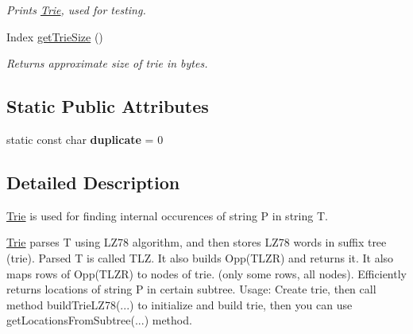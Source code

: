 \begin{DoxyCompactItemize}
\begin{DoxyCompactList}\small\item\em \-Prints \hyperlink{class_trie}{\-Trie}, used for testing. \end{DoxyCompactList}\item 
\hypertarget{class_trie_af486a8cc3ac5664f936a11ab71f7794e}{\-Index \hyperlink{class_trie_af486a8cc3ac5664f936a11ab71f7794e}{get\-Trie\-Size} ()}\label{class_trie_af486a8cc3ac5664f936a11ab71f7794e}

\begin{DoxyCompactList}\small\item\em \-Returns approximate size of trie in bytes. \end{DoxyCompactList}\end{DoxyCompactItemize}
\subsection*{\-Static \-Public \-Attributes}
\begin{DoxyCompactItemize}
\item 
\hypertarget{class_trie_a1e3da53b8903e31a053cfcb53c359f06}{static const char {\bfseries duplicate} = 0}\label{class_trie_a1e3da53b8903e31a053cfcb53c359f06}

\end{DoxyCompactItemize}


\subsection{\-Detailed \-Description}
\hyperlink{class_trie}{\-Trie} is used for finding internal occurences of string \-P in string \-T. 

\hyperlink{class_trie}{\-Trie} parses \-T using \-L\-Z78 algorithm, and then stores \-L\-Z78 words in suffix tree (trie). \-Parsed \-T is called \-T\-L\-Z. \-It also builds \-Opp(\-T\-L\-Z\-R) and returns it. \-It also maps rows of \-Opp(\-T\-L\-Z\-R) to nodes of trie. (only some rows, all nodes). \-Efficiently returns locations of string \-P in certain subtree. \-Usage\-: \-Create trie, then call method build\-Trie\-L\-Z78(...) to initialize and build trie, then you can use get\-Locations\-From\-Subtree(...) method. 


